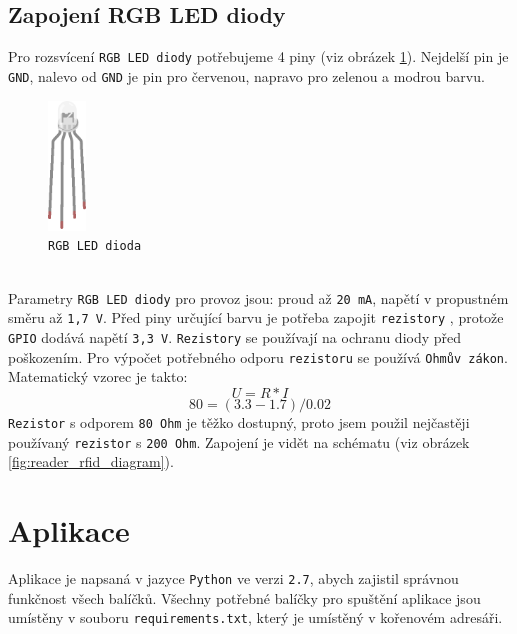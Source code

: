 \documentclass[czech,BP]{thesiskiv}
\begin{document}
\subsection{Zapojení RGB LED diody}
	Pro rozsvícení \texttt{RGB LED diody} potřebujeme 4 piny (viz obrázek \ref{fig:rgb_led_dioda}). Nejdelší pin je \texttt{GND}, nalevo od \texttt{GND} je pin pro červenou, napravo pro zelenou a modrou barvu.
	\begin{figure}[H]
		\centering
		\includegraphics[width=0.09\textwidth]{../images/rgb_led_dioda.png}	
		\caption{\texttt{RGB LED dioda}}
		\label{fig:rgb_led_dioda}
\end{figure}
\ \\
Parametry \texttt{RGB LED diody} pro provoz jsou: proud až \texttt{20 mA}, napětí v propustném směru až \texttt{1,7 V}.
Před piny určující barvu je potřeba zapojit \texttt{rezistory} \cite{voda2016rezistor}, protože \texttt{GPIO} dodává napětí \texttt{3,3 V}.
\texttt{Rezistory} se používají na ochranu diody před poškozením. 
Pro výpočet potřebného odporu \texttt{rezistoru} se používá \texttt{Ohmův zákon}. Matematický vzorec je takto:
\[ U = R * I \]
\[ 80=(3.3-1.7)/0.02 \]
\texttt{Rezistor} s odporem \texttt{80 Ohm} je těžko dostupný, proto jsem použil nejčastěji používaný \texttt{rezistor} s \texttt{200 Ohm}.
Zapojení je vidět na schématu (viz obrázek \ref{fig:reader_rfid_diagram}).


	\section{Aplikace}
Aplikace je napsaná v jazyce \texttt{Python} ve verzi \texttt{2.7}, abych zajistil správnou funkčnost všech balíčků. Všechny potřebné balíčky pro spuštění aplikace jsou umístěny v souboru \texttt{requirements.txt}, který je umístěný v kořenovém adresáři.

\newpage
\end{document}
